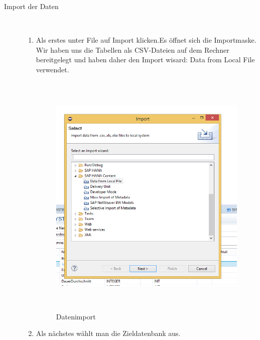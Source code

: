 \documentclass[a4paper, 12pt]{scrartcl}
\begin{document}
\begin{description}
   \item[Import der Daten]~\par
   \begin{enumerate}
      \item Als erstes unter File auf Import klicken.Es öffnet sich die Importmaske. Wir haben uns die Tabellen als CSV-Dateien auf dem Rechner bereitgelegt und haben daher den Import wisard: Data from Local File verwendet.

\begin{figure}[H]
\centering
\includegraphics[height=12cm, width=15cm, keepaspectratio]{hanadb2.png}
\caption{Datenimport}
\end{figure}                
		
      \item Als nächstes wählt man die Zieldatenbank aus.


\end{enumerate}
\end{description}
\end{document}
